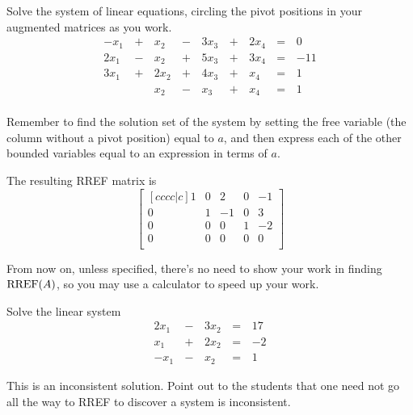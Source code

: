 \begin{applicationActivities}{3}{5}
\begin{activity}{20}
  Solve the system of linear equations,
  circling the pivot positions in your augmented matrices as you work.
    \begin{alignat*}{5}
      -x_1 &\,+\,&  x_2 &\,-\,&  3x_3 &\,+\,&  2x_4 &\,=\,& 0 \\
      2x_1 &\,-\,&  x_2 &\,+\,&  5x_3 &\,+\,&  3x_4 &\,=\,& -11 \\
      3x_1 &\,+\,& 2x_2 &\,+\,&  4x_3 &\,+\,&   x_4 &\,=\,& 1 \\
           &\, \,&  x_2 &\,-\,&   x_3 &\,+\,&   x_4 &\,=\,& 1 \\
    \end{alignat*}

  Remember to find the solution set of the system
  by setting the free variable (the column without a pivot position)
  equal to \(a\), and then express each of the other
  bounded variables equal to an expression in terms of \(a\).

  \begin{TBLnote}
    The resulting RREF matrix is
    \[
      \begin{bmatrix}[cccc|c]
         1 &  0 &  2 &  0 & -1 \\
         0 &  1 & -1 &  0 &  3 \\
         0 &  0 &  0 &  1 & -2 \\
         0 &  0 &  0 &  0 &  0 \\
      \end{bmatrix}
    \]
  \end{TBLnote}
\end{activity}

\begin{remark}
  From now on, unless specified, there's no need to show your work in
  finding \(\operatorname{RREF}(A)\), so you may use a calculator to speed up your work.
\end{remark}

\begin{activity}{10}  Solve the linear system
    \begin{alignat*}{4}
      2x_1 &\,-\,& 3x_2 &\,=\,& 17 \\
       x_1 &\,+\,& 2x_2 &\,=\,& -2 \\
      -x_1 &\,-\,&  x_2 &\,=\,& 1
    \end{alignat*}

    \begin{TBLnote} This is an inconsistent solution.  Point out to the students that one need not go all the way to RREF to discover a system is inconsistent.
    \end{TBLnote}
\end{activity}


\end{applicationActivities}

